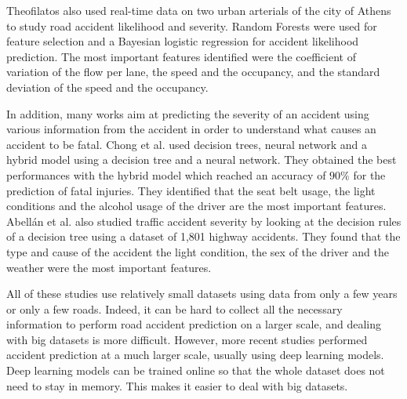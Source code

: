 \documentclass[conference]{IEEEtran}
\begin{document}
Theofilatos\cite{Theofilatos2017} also used
real-time data on two urban arterials of the city of Athens to study road
accident likelihood and severity. Random Forests were used for feature
selection and a Bayesian logistic regression for accident likelihood
prediction. The most important features identified were the coefficient of
variation of the flow per lane, the speed and the occupancy, and the
standard deviation of the speed and the occupancy. 

In addition, many
works aim at predicting the severity of an accident using various
information from the accident in order to understand what causes an
accident to be fatal. Chong et al.\cite{Chong2005} used decision trees,
neural network and a hybrid model using a decision tree and a neural
network. They obtained the best performances with the hybrid model which
reached an accuracy of $90\%$ for the prediction of fatal injuries. They
identified that the seat belt usage, the light conditions and the alcohol
usage of the driver are the most important features. Abellán et al.
\cite{Abellan2013} also studied traffic accident severity by looking at the
decision rules of a decision tree using a dataset of 1,801 highway
accidents. They found that the type and cause of the accident the light
condition, the sex of the driver and the weather were the most important
features.

All of these studies use relatively small datasets using data from only a
few years or only a few roads. Indeed, it can be hard to collect all the
necessary information to perform road accident prediction on a larger
scale, and dealing with big datasets is more difficult. However, more
recent studies performed accident prediction at a much larger scale,
usually using deep learning models. Deep learning models can be trained
online so that the whole dataset does not need to stay in memory. This
makes it easier to deal with big datasets.
\end{document}
